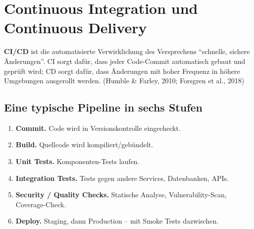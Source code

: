 \documentclass[11pt,a4paper,oneside]{article}
\newcommand{\fachbegriff}[1]{\textbf{#1}}
\newcommand{\quelle}[1]{{\footnotesize\color{lpGray}(#1)}}
\begin{document}
\section{Continuous Integration und Continuous Delivery}

\fachbegriff{CI/CD} ist die automatisierte Verwirklichung des Versprechens ``schnelle, sichere Änderungen''. CI sorgt dafür, dass jeder Code-Commit automatisch gebaut und geprüft wird; CD sorgt dafür, dass Änderungen mit hoher Frequenz in höhere Umgebungen ausgerollt werden. \quelle{Humble \& Farley, 2010; Forsgren et al., 2018}

\subsection{Eine typische Pipeline in sechs Stufen}

\begin{enumerate}
  \item \fachbegriff{Commit.} Code wird in Versionskontrolle eingecheckt.
  \item \fachbegriff{Build.} Quellcode wird kompiliert/gebündelt.
  \item \fachbegriff{Unit Tests.} Komponenten-Tests laufen.
  \item \fachbegriff{Integration Tests.} Tests gegen andere Services, Datenbanken, APIs.
  \item \fachbegriff{Security / Quality Checks.} Statische Analyse, Vulnerability-Scan, Coverage-Check.
  \item \fachbegriff{Deploy.} Staging, dann Production -- mit Smoke Tests dazwischen.
\end{enumerate}
\end{document}
